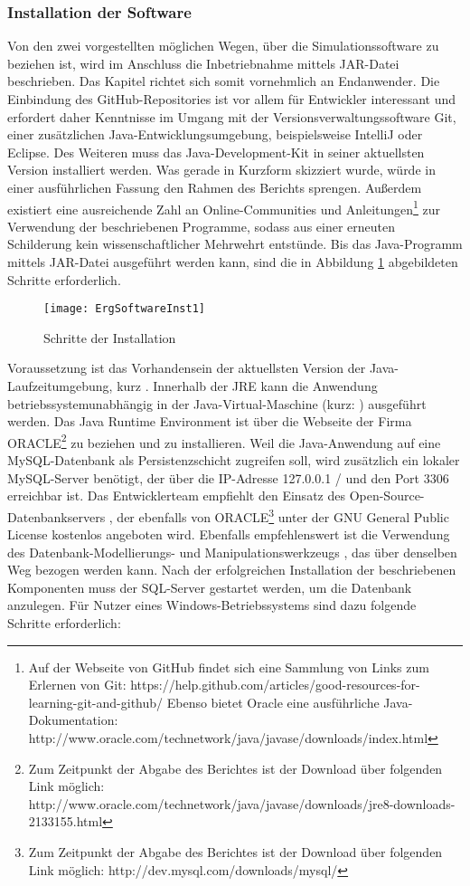 \subsubsection{Installation der Software}
Von den zwei vorgestellten möglichen Wegen, über die Simulationssoftware zu beziehen ist, wird im Anschluss die Inbetriebnahme mittels JAR-Datei beschrieben. Das Kapitel richtet sich somit vornehmlich an Endanwender.
Die Einbindung des GitHub-Repositories ist vor allem für Entwickler interessant und erfordert daher Kenntnisse im Umgang mit der Versionsverwaltungssoftware Git, einer zusätzlichen Java-Entwicklungsumgebung, beispielsweise IntelliJ oder Eclipse. Des Weiteren muss das Java-Development-Kit in seiner aktuellsten Version installiert werden. Was gerade in Kurzform skizziert wurde, würde in einer ausführlichen Fassung den Rahmen des Berichts sprengen. Außerdem existiert eine ausreichende Zahl an Online-Communities und Anleitungen\footnote{Auf der Webseite von GitHub findet sich eine Sammlung von Links zum Erlernen von Git: https://help.github.com/articles/good-resources-for-learning-git-and-github/
Ebenso bietet Oracle eine ausführliche Java-Dokumentation: http://www.oracle.com/technetwork/java/javase/downloads/index.html} zur Verwendung der beschriebenen Programme, sodass aus einer erneuten Schilderung kein wissenschaftlicher Mehrwehrt entstünde.
Bis das Java-Programm mittels JAR-Datei ausgeführt werden kann, sind die in Abbildung \ref{fig:ErgSoftwareInst1} abgebildeten Schritte erforderlich.
\begin{figure}[ht]
	\centering
	\texttt{[image: ErgSoftwareInst1]}
	\caption{Schritte der Installation}
	\label{fig:ErgSoftwareInst1}
\end{figure}
Voraussetzung ist das Vorhandensein der aktuellsten Version der Java-Laufzeitumgebung, kurz . Innerhalb der JRE kann die Anwendung betriebssystemunabhängig in der Java-Virtual-Maschine (kurz: ) ausgeführt werden. Das Java Runtime Environment ist über die Webseite der Firma ORACLE\footnote{Zum Zeitpunkt der Abgabe des Berichtes ist der Download über folgenden Link möglich: http://www.oracle.com/technetwork/java/javase/downloads/jre8-downloads-2133155.html} zu beziehen und zu installieren.
Weil die Java-Anwendung auf eine MySQL-Datenbank als Persistenzschicht zugreifen soll, wird zusätzlich ein lokaler MySQL-Server benötigt, der über die IP-Adresse 127.0.0.1 /  und den Port 3306 erreichbar ist. Das Entwicklerteam empfiehlt den Einsatz des Open-Source-Datenbankservers , der ebenfalls von ORACLE\footnote{Zum Zeitpunkt der Abgabe des Berichtes ist der Download über folgenden Link möglich: http://dev.mysql.com/downloads/mysql/} unter der GNU General Public License kostenlos angeboten wird. Ebenfalls empfehlenswert ist die Verwendung des Datenbank-Modellierungs- und Manipulationswerkzeugs , das über denselben Weg bezogen werden kann.
Nach der erfolgreichen Installation der beschriebenen Komponenten muss der SQL-Server gestartet werden, um die Datenbank anzulegen. Für Nutzer eines Windows-Betriebssystems sind dazu folgende Schritte erforderlich:


